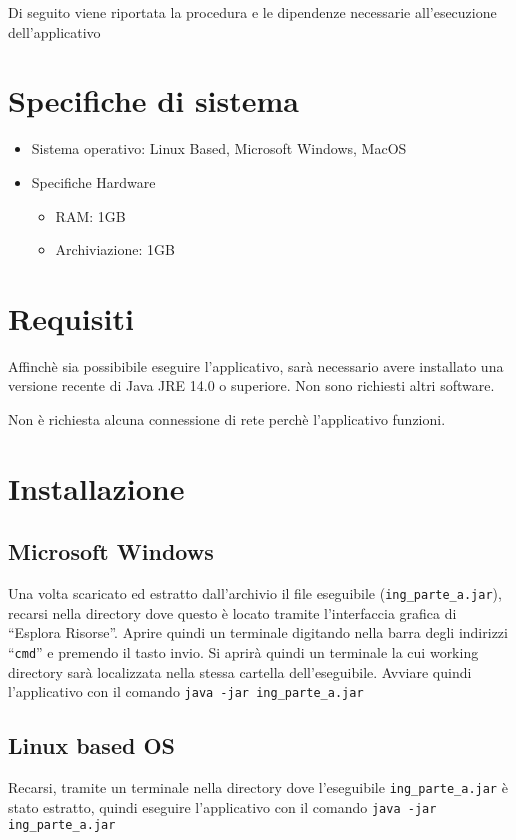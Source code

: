 Di seguito viene riportata la procedura e le dipendenze necessarie all'esecuzione dell'applicativo

\section{Specifiche di sistema}
\begin{itemize}
    \item Sistema operativo: Linux Based, Microsoft Windows, MacOS
    \item Specifiche Hardware
    \begin{itemize}
        \item RAM: 1GB
        \item Archiviazione: 1GB
    \end{itemize}
\end{itemize}

\section{Requisiti}

Affinchè sia possibibile eseguire l'applicativo, sarà necessario avere installato una versione recente di Java JRE 14.0 o superiore.
Non sono richiesti altri software.

Non è richiesta alcuna connessione di rete perchè l'applicativo funzioni.

\section{Installazione}

\subsection{Microsoft Windows}
Una volta scaricato ed estratto dall'archivio il file eseguibile (\texttt{ing\_parte\_a.jar}), recarsi nella directory dove questo è locato tramite l'interfaccia grafica di ``Esplora Risorse''.
Aprire quindi un terminale digitando nella barra degli indirizzi ``\texttt{cmd}'' e premendo il tasto invio.
Si aprirà quindi un terminale la cui working directory sarà localizzata nella stessa cartella dell'eseguibile.
Avviare quindi l'applicativo con il comando \texttt{java -jar ing\_parte\_a.jar}

\subsection{Linux based OS}
Recarsi, tramite un terminale nella directory dove l'eseguibile \texttt{ing\_parte\_a.jar} è stato estratto, quindi eseguire l'applicativo con il comando \texttt{java -jar ing\_parte\_a.jar}